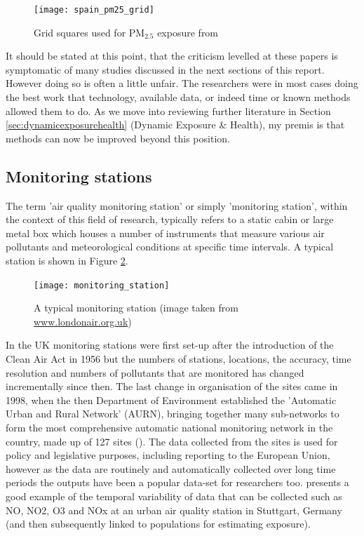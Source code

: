 \begin{figure}[H]
\centering
\texttt{[image: spain\_pm25\_grid]}
\caption{Grid squares used for PM$_{2.5}$ exposure from \cite{Boldo2011}}
\label{fig:gspain_pm25_grid}
\end{figure}

It should be stated at this point, that the criticism levelled at these papers is symptomatic of many studies discussed in the next sections of this report. However doing so is often a little unfair. The researchers were in most cases doing the best work that technology, available data, or indeed time or known methods allowed them to do. As we move into reviewing further literature in Section \ref{sec:dynamicexposurehealth} (Dynamic Exposure \& Health), my premis is that methods can now be improved beyond this position.\hfill


\subsection{Monitoring stations}
\label{subsec:monitoringstation}

The term 'air quality monitoring station' or simply 'monitoring station', within the context of this field of research, typically refers to a static cabin or large metal box which houses a number of instruments that measure various air pollutants and meteorological conditions at specific time intervals. A typical station is shown in Figure \ref{fig:monitoring_station}.\hfill

\begin{figure}[H]
\centering
\texttt{[image: monitoring\_station]}
\caption{A typical monitoring station (image taken from \url{www.londonair.org.uk})}
\label{fig:monitoring_station}
\end{figure}

In the UK monitoring stations were first set-up after the introduction of the Clean Air Act in 1956 but the numbers of stations, locations, the accuracy, time resolution and numbers of pollutants that are monitored has changed incrementally since then. The last change in organisation of the sites came in 1998, when the then Department of Environment established the 'Automatic Urban and Rural Network' (AURN), bringing together many sub-networks to form the most comprehensive automatic national monitoring network in the country, made up of 127 sites (\cite{DEFRA2011a}). The data collected from the sites is used for policy and legislative purposes, including reporting to the European Union, however as the data are routinely and automatically collected over long time periods the outputs have been a popular data-set for researchers too. \cite{Mayer1999} presents a good example of the temporal variability of data that can be collected such as NO, NO2, O3 and NOx at an urban air quality station in Stuttgart, Germany (and then subsequently linked to populations for estimating exposure).\hfill

